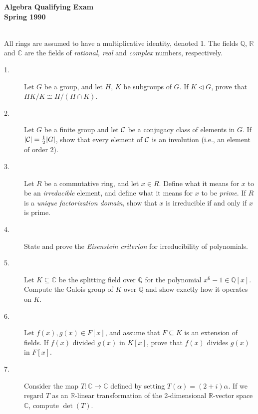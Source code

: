 \documentclass{article}
\def\R{\mathbb R}
\def\C{\mathbb C}
\def\Q{\mathbb Q}
\begin{document}



\begin{center}\begin{LARGE}
{\bf Algebra Qualifying Exam}\\ 
{\bf Spring 1990}\\ \end{LARGE}
\end{center}
\vspace{0.1in}
\noindent\hrulefill\\
All rings are assumed to have a multiplicative identity, denoted 1. The
fields $\Q$, $\R$ and $\C$ are the fields of {\it rational, real} and
{\it complex} numbers, respectively.

\begin{description}
\item[1.]
Let $G$ be a group, and let $H$, $K$ be subgroups of $G$. If
$K \triangleleft G$, prove that $HK/K \cong H/(H \cap K)$.

\item[2.]
Let $G$ be a finite group and let $\cal C$ be a conjugacy class of elements
in $G$. If $|{\cal C}| = \frac{1}{2} |G|$, show that every element of
$\cal C$ is an involution (i.e., an element of order 2).

\item[3.]
Let $R$ be a commutative ring, and let $x \in R$. Define what it means for $x$
to be an {\it irreducible} element, and define what it means for $x$
to be {\it prime}. If $R$ is a {\it unique factorization domain}, show that
$x$ is irreducible if and only if $x$ is prime.

\item[4.]
State and prove the {\it Eisenstein criterion} for irreducibility of
polynomials.

\item[5.]
Let $K \subseteq \C$ be the splitting field over $\Q$ for the polynomial
$x^6-1 \in \Q[x]$. Compute the Galois group of $K$ over $\Q$ and show exactly
how it operates on $K$.

\item[6.]
Let $f(x), g(x) \in F[x]$, and assume that $F \subseteq K$ is an extension of
fields. If $f(x)$ divided $g(x)$ in $K[x]$, prove that $f(x)$ divides $g(x)$
in $F[x]$.

\item[7.]
Consider the map $T: \C \to \C$ defined by setting $T(\alpha) = (2 + i) \alpha$.
If we regard $T$ as an $\R$-linear transformation of the 2-dimensional
$\R$-vector space $\C$, compute $\det(T)$.


\end{description}
\end{document}
